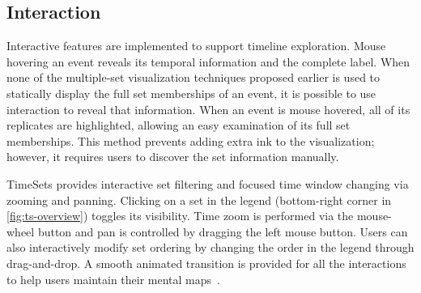 \subsection{Interaction}
\label{sub:interaction}
Interactive features are implemented to support timeline exploration. Mouse hovering an event reveals its temporal information and the complete label. When none of the multiple-set visualization techniques proposed earlier is used to statically display the full set memberships of an event, it is possible to use interaction to reveal that information. When an event is mouse hovered, all of its replicates are highlighted, allowing an easy examination of its full set memberships. This method prevents adding extra ink to the visualization; however, it requires users to discover the set information manually.

TimeSets provides interactive set filtering and focused time window changing via zooming and panning. Clicking on a set in the legend (bottom-right corner in \autoref{fig:ts-overview}) toggles its visibility. Time zoom is performed via the mouse-wheel button and pan is controlled by dragging the left mouse button. Users can also interactively modify set ordering by changing the order in the legend through drag-and-drop. A smooth animated transition is provided for all the interactions to help users maintain their mental maps~\cite{Elmqvist2011}.